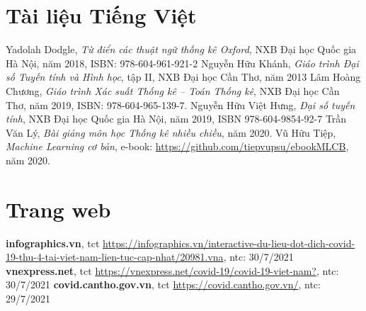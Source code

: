 \documentclass[./thesis.tex]{subfiles}
\begin{document}
	\begin{thebibliography}{10}
  
  
  	\section*{Tài liệu Tiếng Việt}
		   Yadolah Dodgle, \textit{Từ điển các thuật ngữ thống kê Oxford}, NXB Đại học Quốc gia Hà Nội, năm 2018, ISBN: 978-604-961-921-2
		   Nguyễn Hữu Khánh, \textit{Giáo trình Đại số Tuyến tính và Hình học}, tập II, NXB Đại học Cần Thơ, năm 2013
		   Lâm Hoàng Chương, \textit{Giáo trình Xác suất Thống kê -- Toán Thống kê}, NXB Đại học Cần Thơ, năm 2019, ISBN: 978-604-965-139-7.
		   Nguyễn Hữu Việt Hưng, \textit{Đại số tuyến tính}, NXB Đại học Quốc gia Hà Nội, năm 2019, ISBN 978-604-9854-92-7
		   Trần Văn Lý, \textit{Bài giảng môn học Thống kê nhiều chiều}, năm 2020.
		   Vũ Hữu Tiệp, \textit{Machine Learning cơ bản}, e-book: \url{https://github.com/tiepvupsu/ebookMLCB}, năm 2020.
      
		\section*{Trang web}
		   \textbf{infographics.vn}, tct \url{https://infographics.vn/interactive-du-lieu-dot-dich-covid-19-thu-4-tai-viet-nam-lien-tuc-cap-nhat/20981.vna}, ntc: 30/7/2021
		   \textbf{vnexpress.net}, tct \url{https://vnexpress.net/covid-19/covid-19-viet-nam?}, ntc: 30/7/2021
		   \textbf{covid.cantho.gov.vn}, tct \url{https://covid.cantho.gov.vn/}, ntc: 29/7/2021
		
	\end{thebibliography}
	
\end{document}
